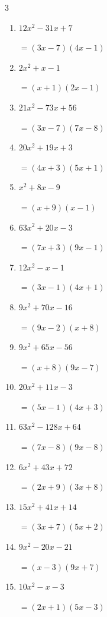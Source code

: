 \begin{multicols}{3}
\begin{enumerate}
        $=(3x-5)(3x+5)$

  \item $12x^{2}-31x+7$

        $=(3x-7)(4x-1)$

  \item $2x^{2}+x-1$

        $=(x+1)(2x-1)$

  \item $21x^{2}-73x+56$

        $=(3x-7)(7x-8)$

  \item $20x^{2}+19x+3$

        $=(4x+3)(5x+1)$

  \item $x^{2}+8x-9$

        $=(x+9)(x-1)$

\columnbreak %

  \item $63x^{2}+20x-3$

        $=(7x+3)(9x-1)$

  \item $12x^{2}-x-1$

        $=(3x-1)(4x+1)$

  \item $9x^{2}+70x-16$

        $=(9x-2)(x+8)$

  \item $9x^{2}+65x-56$

        $=(x+8)(9x-7)$

  \item $20x^{2}+11x-3$

        $=(5x-1)(4x+3)$

  \item $63x^{2}-128x+64$

        $=(7x-8)(9x-8)$

  \item $6x^{2}+43x+72$

        $=(2x+9)(3x+8)$

  \item $15x^{2}+41x+14$

        $=(3x+7)(5x+2)$

  \item $9x^{2}-20x-21$

        $=(x-3)(9x+7)$

  \item $10x^{2}-x-3$

        $=(2x+1)(5x-3)$


\end{enumerate}
\end{multicols}
